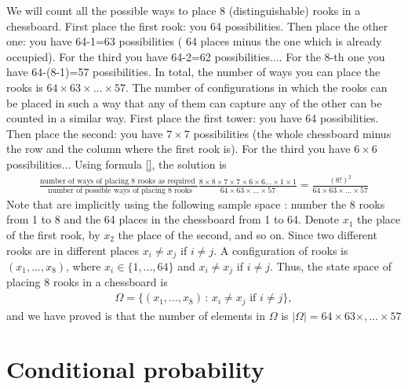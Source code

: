 \documentclass[12pt]{article}
\newcommand{\<}{{\langle \!\! \langle}}
\renewcommand{\>}{{\rangle \!\! \rangle}}
\newcommand{\bel}[2]{\begin{equation} \label{#1} \begin{split} #2
 					\end{split} \end{equation}}
\begin{document}
\begin{ExerciseList}
\Answer

We will count all the possible ways to place 8 (distinguishable) rooks in a chessboard. First place the first rook: you 64 possibilities. Then place the other one: you have 64-1=63 possibilities ( 64 places minus the one which is already occupied). For the third you have 64-2=62 possibilities.... For the 8-th one you have 64-(8-1)=57 possibilities. In total, the number of ways you can place the rooks is $64\times 63\times...\times 57$. The number of configurations in which the rooks can be placed in such a way that any of them can capture any of the other can be counted in a similar way. First place the first tower: you have 64 possibilities. Then place the second: you have $7\times 7$ possibilities (the whole chessboard minus the row and the column where the first rook is). For the third you have $6\times 6$ possibilities... Using formula \eqref{}, the solution is  
\bel{}{\frac{\textrm{number of ways of placing 8 rooks as required }}{\textrm{ number of possible ways of placing 8 rooks}}\frac{8\times8\times7\times7\times6\times6...\times1\times1}{64\times63\times...\times57}=\frac{(8!)^2}{64\times 63\times...\times 57}}
Note that  are implicitly using the following sample space :
number the 8 rooks from 1 to 8 and the 64 places in the chessboard from 1 to 64. Denote $x_1$ the place of the first rook, by $x_2$ the place of the second, and so on. Since two different rooks are in different places $x_i\neq x_j$ if $i\neq j$. A configuration of rooks is $(x_1,...,x_8)$, where $x_i\in\{1,...,64\}$ and $x_i \neq x_j $ if $i\neq j$. Thus, the state space of placing  8 rooks in a chessboard is  
\bel{}{\Omega=\{(x_1,...,x_8)\,:\,x_i\neq x_j \textrm{ if } i\neq j\},}
and we have proved is that the number of elements in $\Omega$ is $|\Omega|=64\times63\times,...\times 57$

\end{ExerciseList}



\section{Conditional probability}
\end{document}
